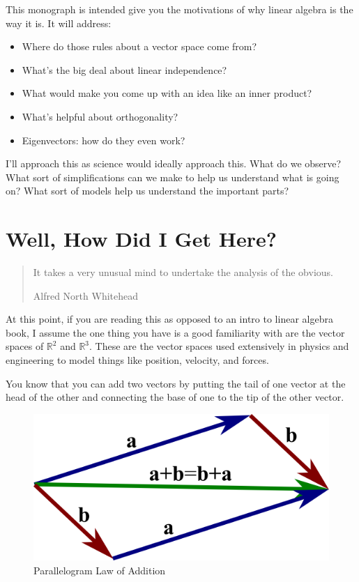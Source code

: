 \documentclass[
]{book}
\providecommand{\tightlist}{%
  \setlength{\itemsep}{0pt}\setlength{\parskip}{0pt}}
\begin{document}
This monograph is intended give you the motivations of why linear algebra is the way it is. It will address:

\begin{itemize}
\tightlist
\item
  Where do those rules about a vector space come from?
\item
  What's the big deal about linear independence?
\item
  What would make you come up with an idea like an inner product?
\item
  What's helpful about orthogonality?
\item
  Eigenvectors: how do they even work?
\end{itemize}

I'll approach this as science would ideally approach this. What do we observe? What sort of simplifications can we make to help us understand what is going on? What sort of models help us understand the important parts?

\hypertarget{well-how-did-i-get-here}{%
\chapter{Well, How Did I Get Here?}\label{well-how-did-i-get-here}}

\begin{quote}
It takes a very unusual mind to undertake the analysis of the obvious.

Alfred North Whitehead
\end{quote}

At this point, if you are reading this as opposed to an intro to linear algebra book, I assume the one thing you have is a good familiarity with are the vector spaces of \(\mathbb{R}^2\) and \(\mathbb{R}^3\). These are the vector spaces used extensively in physics and engineering to model things like position, velocity, and forces.

You know that you can add two vectors by putting the tail of one vector at the head of the other and connecting the base of one to the tip of the other vector.

\begin{figure}

{\centering \includegraphics[width=0.75\linewidth,height=0.75\textheight]{images/vector_parallelogram_law} 

}

\caption{Parallelogram Law of Addition}\label{fig:unnamed-chunk-1}
\end{figure}
\end{document}

